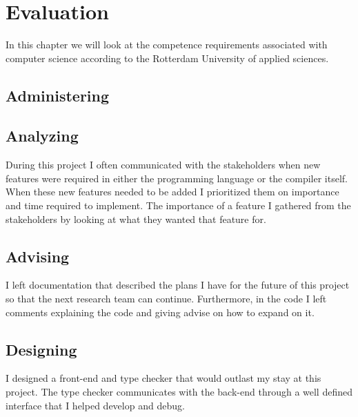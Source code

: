 \section{Evaluation}
In this chapter we will look at the competence requirements associated with computer science according to the Rotterdam University of applied sciences.

\subsection{Administering}


\subsection{Analyzing}
During this project I often communicated with the stakeholders when new features were required in either the programming language or the compiler itself. When these new features needed to be added I prioritized them on importance and time required to implement. The importance of a feature I gathered from the stakeholders by looking at what they wanted that feature for.

\subsection{Advising}
I left documentation that described the plans I have for the future of this project so that the next research team can continue. Furthermore, in the code I left comments explaining the code and giving advise on how to expand on it. 

\subsection{Designing}
I designed a front-end and type checker that would outlast my stay at this project. The type checker communicates with the back-end through a well defined interface that I helped develop and debug.

